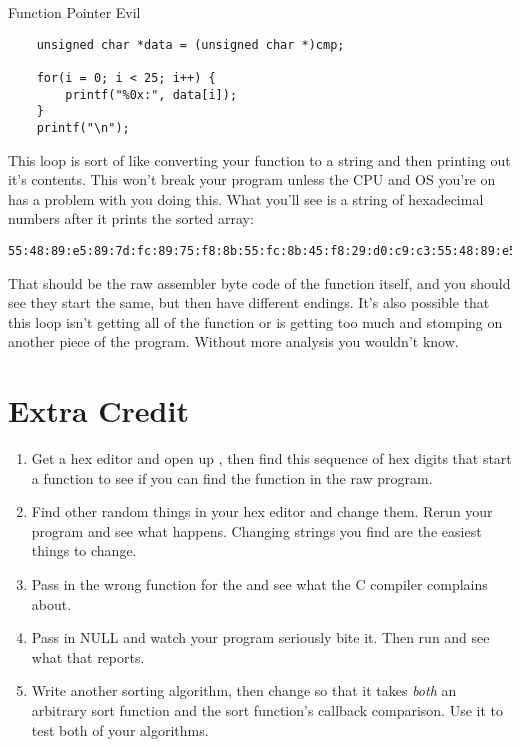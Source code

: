 \begin{code}{Function Pointer Evil}
\begin{lstlisting}
    unsigned char *data = (unsigned char *)cmp;

    for(i = 0; i < 25; i++) {
        printf("%0x:", data[i]);
    }
    printf("\n");
\end{lstlisting}
\end{code}

This loop is sort of like converting your function to a string and then
printing out it's contents.  This won't break your program unless the CPU and
OS you're on has a problem with you doing this.  What you'll see is a string of
hexadecimal numbers after it prints the sorted array:

\begin{Verbatim}
55:48:89:e5:89:7d:fc:89:75:f8:8b:55:fc:8b:45:f8:29:d0:c9:c3:55:48:89:e5:89:
\end{Verbatim}

That should be the raw assembler byte code of the function itself, and you
should see they start the same, but then have different endings.  It's also
possible that this loop isn't getting all of the function or is getting too
much and stomping on another piece of the program.  Without more analysis
you wouldn't know.

\section{Extra Credit}

\begin{enumerate}
\item Get a hex editor and open up , then find this sequence
    of hex digits that start a function to see if you can find the function
    in the raw program.
\item Find other random things in your hex editor and change them.  Rerun your
    program and see what happens.  Changing strings you find are the easiest
    things to change.
\item Pass in the wrong function for the  and see what
    the C compiler complains about.
\item Pass in NULL and watch your program seriously bite it.  Then run
     and see what that reports.
\item Write another sorting algorithm, then change  so
    that it takes \emph{both} an arbitrary sort function and the sort function's
    callback comparison.  Use it to test both of your algorithms.
\end{enumerate}


